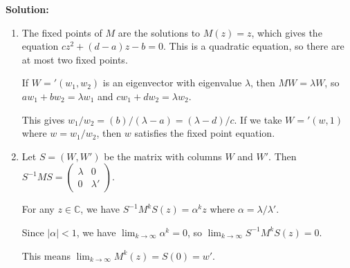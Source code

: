 \noindent\textbf{Solution:}
\begin{enumerate}[label=(\alph*)]
\item The fixed points of $M$ are the solutions to $M(z) = z$, which gives the equation $cz^2 + (d-a)z - b = 0$. This is a quadratic equation, so there are at most two fixed points.

If $W = '(w_1, w_2)$ is an eigenvector with eigenvalue $\lambda$, then $MW = \lambda W$, so $aw_1 + bw_2 = \lambda w_1$ and $cw_1 + dw_2 = \lambda w_2$.

This gives $w_1/w_2 = (b)/(\lambda - a) = (\lambda - d)/c$. If we take $W = '(w, 1)$ where $w = w_1/w_2$, then $w$ satisfies the fixed point equation.

\item Let $S = (W, W')$ be the matrix with columns $W$ and $W'$. Then $S^{-1}MS = \begin{pmatrix} \lambda & 0 \\ 0 & \lambda' \end{pmatrix}$.

For any $z \in \mathbb{C}$, we have $S^{-1}M^kS(z) = \alpha^k z$ where $\alpha = \lambda/\lambda'$.

Since $|\alpha| < 1$, we have $\lim_{k \to \infty} \alpha^k = 0$, so $\lim_{k \to \infty} S^{-1}M^kS(z) = 0$.

This means $\lim_{k \to \infty} M^k(z) = S(0) = w'$.
\end{enumerate}


